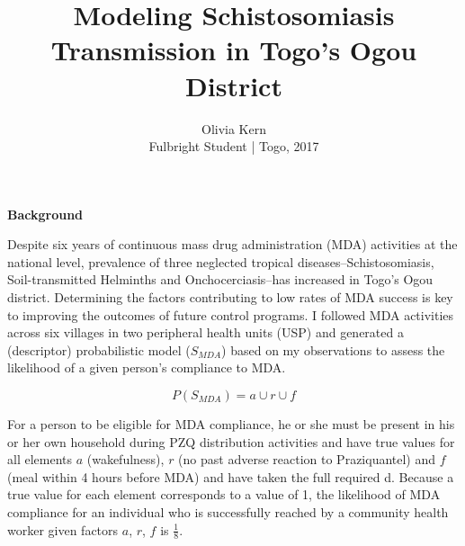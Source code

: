 \documentclass[12pt]{article}
\begin{document}
 

 
 
\title{Modeling Schistosomiasis Transmission in Togo's Ogou District}
\author{Olivia Kern\\
Fulbright Student | Togo, 2017} 
 
\maketitle \textbf{Background}

Despite six years of continuous mass drug administration (MDA) activities at the national level, prevalence of three neglected tropical diseases--Schistosomiasis, Soil-transmitted Helminths and Onchocerciasis--has increased in Togo's Ogou district. Determining the factors contributing to low rates of MDA success is key to improving the outcomes of future control programs. I followed MDA activities across six villages in two peripheral health units (USP) and generated a (descriptor) probabilistic model  ($S_{MDA}$) based on my observations to assess the likelihood of a given person's compliance to MDA. 

\begin{equation}\label{eq:probMDA}
 P(S_{MDA}) = a \cup r \cup f
\end{equation}

 For a person to be eligible for MDA compliance, he or she must be present in his or her own household during PZQ distribution activities and have true values for all elements $a$ (wakefulness), $r$ (no past adverse reaction to Praziquantel) and $f$ (meal within 4 hours before MDA) and have taken the full required d. Because a true value for each element corresponds to a value of 1,
 the likelihood of  MDA compliance for an individual who is successfully reached by a community health worker given factors $a$, $r$, $f$ is $\frac{1}{8}$.
\linebreak

\end{document}
